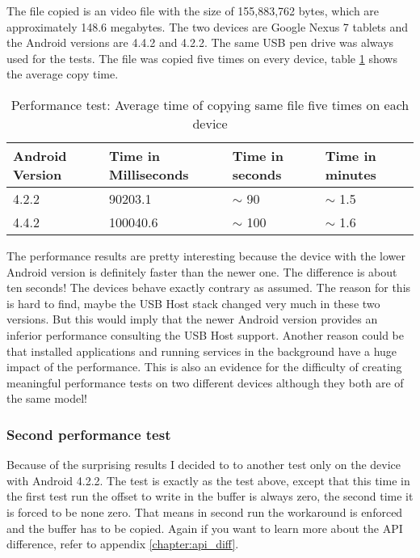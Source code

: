 The file copied is an video file with the size of 155,883,762 bytes, which are approximately 148.6 megabytes. The two devices are Google Nexus 7 tablets and the Android versions are 4.4.2 and 4.2.2. The same USB pen drive was always used for the tests. The file was copied five times on every device, table \ref{table:performance_test} shows the average copy time.

\begin{table}[ht]
\caption{Performance test: Average time of copying same file five times on each device}
\centering
\begin{tabular}{|l|l|l|l|}
\hline\hline
\textbf{Android Version} & \textbf{Time in Milliseconds} & \textbf{Time in seconds} & \textbf{Time in minutes} \\ \hline
4.2.2 & 90203.1 & $\sim$ 90 & $\sim$ 1.5 \\ \hline
4.4.2 & 100040.6 & $\sim$ 100 & $\sim$ 1.6 \\ \hline
\end{tabular}
\label{table:performance_test}
\end{table}

The performance results are pretty interesting because the device with the lower Android version is definitely faster than the newer one. The difference is about ten seconds! The devices behave exactly contrary as assumed. The reason for this is hard to find, maybe the USB Host stack changed very much in these two versions. But this would imply that the newer Android version provides an inferior performance consulting the USB Host support. Another reason could be that installed applications and running services in the background have a huge impact of the performance. This is also an evidence for the difficulty of creating meaningful performance tests on two different devices although they both are of the same model!

\subsubsection{Second performance test}

Because of the surprising results I decided to to another test only on the device with Android 4.2.2. The test is exactly as the test above, except that this time in the first test run the offset to write in the buffer is always zero, the second time it is forced to be none zero. That means in second run the workaround is enforced and the buffer has to be copied. Again if you want to learn more about the API difference, refer to appendix \ref{chapter:api_diff}.

